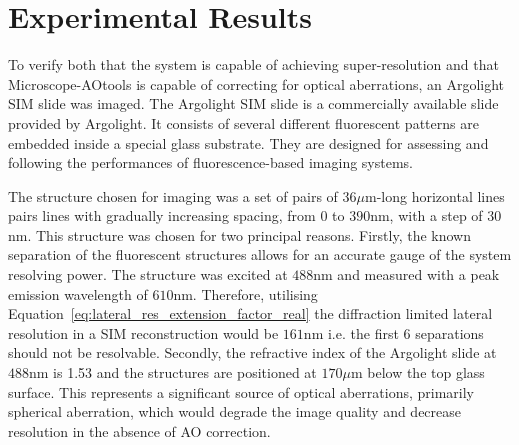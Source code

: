 \section{Experimental Results}
\label{sec:DeepSIM_results}

To verify both that the system is capable of achieving super-resolution
and that Microscope-AOtools is capable of correcting for optical 
aberrations, an Argolight SIM slide was imaged. The Argolight SIM slide 
is a commercially available slide provided by Argolight. It consists of 
several different fluorescent patterns are embedded inside a special 
glass substrate. They are designed for assessing and following
the performances of fluorescence-based imaging systems.\cite{argolight2017user}

The structure chosen for imaging was a set of pairs of $36 \mu$m-long 
horizontal lines pairs lines with gradually increasing spacing, from $0$ 
to $390$nm, with a step of $30$nm. This structure was chosen for two 
principal reasons. Firstly, the known separation of the fluorescent 
structures allows for an accurate gauge of the system resolving power. 
The structure was excited at $488$nm and measured with a peak emission 
wavelength of $610$nm. Therefore, utilising 
Equation~\ref{eq:lateral_res_extension_factor_real} the diffraction 
limited lateral resolution in a SIM reconstruction would be $161$nm i.e. 
the first 6 separations should not be resolvable. Secondly, the refractive 
index of the Argolight slide at $488$nm is 1.53 and the structures are 
positioned at $170\mu$m below the top glass surface\cite{argolight2017user}.
This represents a significant source of optical aberrations, primarily
spherical aberration, which would degrade the image quality and decrease
resolution in the absence of AO correction.

